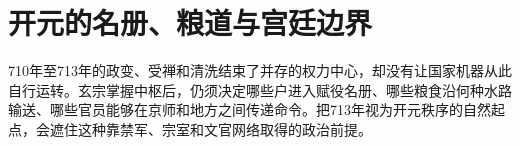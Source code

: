 \section{开元的名册、粮道与宫廷边界} \label{sec:xuanzong-households-transport-court}  710年至713年的政变、受禅和清洗结束了并存的权力中心，却没有让国家机器从此自行运转。玄宗掌握中枢后，仍须决定哪些户进入赋役名册、哪些粮食沿何种水路输送、哪些官员能够在京师和地方之间传递命令。把713年视为开元秩序的自然起点，会遮住这种靠禁军、宗室和文官网络取得的政治前提。%